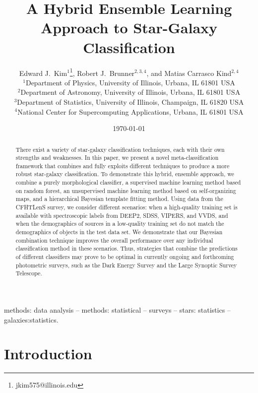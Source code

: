 \documentclass[useAMS,usenatbib]{mn2e}
\title[A Hybrid Approach to Star-Galaxy Classification]{A Hybrid Ensemble Learning Approach to Star-Galaxy Classification}
\author[E. J. Kim, R. J. Brunner \& M. Carrasco Kind]{
  Edward J.~Kim$^1$\thanks{jkim575@illinois.edu},
  Robert J.~Brunner$^{2,3,4}$,
  and Matias Carrasco Kind$^{2,4}$\\
$^1$Department of Physics, University of Illinois, Urbana, IL 61801 USA\\
$^2$Department of Astronomy, University of Illinois, Urbana, IL 61801 USA\\
$^3$Department of Statistics, University of Illinois, Champaign, IL 61820 USA\\
$^4$National Center for Supercomputing Applications, Urbana, IL 61801 USA}
\begin{document}
\date{\today}

\pagerange{\pageref{firstpage}--\pageref{lastpage}} 

\maketitle

\label{firstpage}
\begin{abstract}
There exist a variety of star-galaxy classification techniques,
each with their own strengths and weaknesses.
In this paper, we present a novel meta-classification
framework that combines and fully exploits different techniques
to produce a more robust star-galaxy classification.
To demonstrate this hybrid, ensemble approach,
we combine a purely morphological classifier,
a supervised machine learning method based on random forest,
an unsupervised machine learning method based on self-organizing maps,
and a hierarchical Bayesian template fitting method.
Using data from the CFHTLenS survey,
we consider different scenarios:
when a high-quality training set is available with spectroscopic labels from
DEEP2, SDSS, VIPERS, and VVDS, and
when the demographics of sources in a low-quality training set
do not match the demographics of objects in the test data set.
We demonstrate that our Bayesian combination technique improves
the overall performance over any individual classification method
in these scenarios.
Thus, strategies that combine the predictions of different classifiers
may prove to be optimal in currently ongoing and forthcoming
photometric surveys,
such as the Dark Energy Survey and the Large Synoptic Survey Telescope.

\end{abstract}

\begin{keywords}
methods: data analysis -- methods: statistical -- surveys -- stars: statistics
-- galaxies:statistics.
\end{keywords}


\section{Introduction}
  \label{section:introduction}
\end{document}
